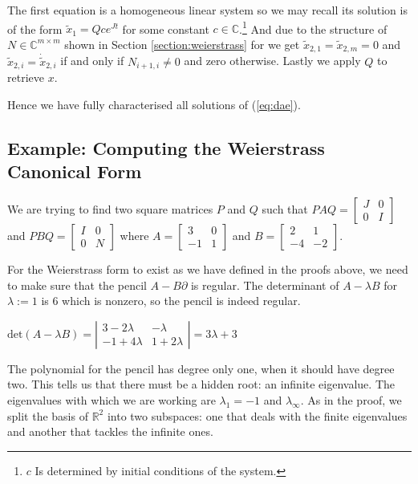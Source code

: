 The first equation is a homogeneous linear system so we may recall its solution is of the form \(\tilde x_1 = Qce^{Jt}\) for some constant \(c \in \mathbb{C}\).\footnote{\(c\) Is determined by initial conditions of the system.}
And due to the structure of \(N \in \mathbb{C}^{m \times m}\) shown in Section \ref{section:weierstrass} for  we get \(\tilde x_{2,1} = \tilde x_{2,m} = 0\) and \(\tilde x_{2, i} = \dot{\tilde x}_{2, i}\) if and only if  \(N_{i+1, i} \neq 0\) and zero otherwise. Lastly we apply \(Q\) to retrieve \(x\).

Hence we have fully characterised all solutions of (\ref{eq:dae}).



\subsection{Example: Computing the Weierstrass Canonical Form}

We are trying to find two square matrices $P$ and $Q$ such that
$PAQ = 
\begin{bmatrix}
    J & 0 \\ 0 & I
\end{bmatrix}$
and $PBQ = \begin{bmatrix}
    I & 0 \\ 0 & N
\end{bmatrix}$
where $A = \begin{bmatrix}
    3 & 0 \\ -1 & 1
\end{bmatrix}$
and $B = \begin{bmatrix}
    2 & 1 \\ -4 & -2
\end{bmatrix}$.


For the Weierstrass form to exist as we have defined in the proofs above, we need to make sure that the pencil $A - B\partial$ is regular.
The determinant of $A-\lambda B$ for $\lambda := 1$ is $6$ which is nonzero, so the pencil is indeed regular.
\begin{center}
    $\text{det}(A-\lambda B) = \left | \begin{matrix}
    3 - 2\lambda & -\lambda \\ -1 +4\lambda & 1 + 2\lambda
    \end{matrix} \right | = 3\lambda + 3$
\end{center}
The polynomial for the pencil has degree only one, when it should have degree two. This tells us that there must be a hidden root: an infinite eigenvalue.
The eigenvalues with which we are working are $\lambda_1 = -1$ and $\lambda_\infty$. As in the proof, we split the basis of $\mathbb{R}^2$ into two subspaces: one that deals with the finite eigenvalues and another that tackles the infinite ones.

